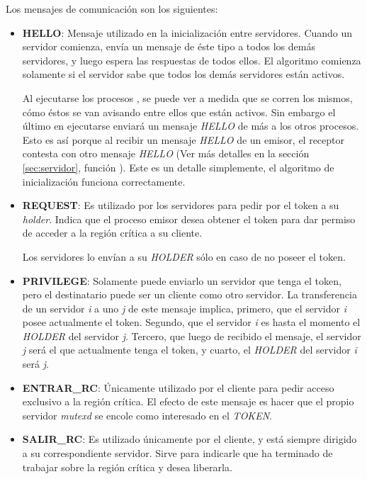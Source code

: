 Los mensajes de comunicación son los siguientes:

\begin{itemize}

\item \textbf{HELLO}: Mensaje utilizado en la inicialización entre servidores.
Cuando un servidor comienza, envía un mensaje de éste tipo a todos los demás
servidores, y luego espera las respuestas de todos ellos. El algoritmo comienza
solamente si el servidor sabe que todos los demás servidores están activos.

Al ejecutarse los procesos , se puede ver a medida que se
corren los mismos, cómo éstos se van avisando entre ellos que están activos.
Sin embargo el último en ejecutarse enviará un mensaje \emph{HELLO} de más a
los otros procesos. Esto es así porque al recibir un mensaje \emph{HELLO} de un
emisor, el receptor contesta con otro mensaje \emph{HELLO} (Ver más detalles en
la sección \ref{sec:servidor}, función ). Este es un
detalle simplemente, el algoritmo de inicialización funciona correctamente.

\item \textbf{REQUEST}: Es utilizado por los servidores para pedir por el token
a su \emph{holder}. Indica que el proceso  emisor desea obtener
el token para dar permiso de acceder a la región crítica a su cliente.

Los servidores lo envían a su \emph{HOLDER} sólo en caso de no poseer el token.

\item \textbf{PRIVILEGE}: Solamente puede enviarlo un servidor que tenga el
token, pero el destinatario puede ser un cliente como otro servidor. La
transferencia de un servidor \textsl{i} a uno \textsl{j} de este mensaje
implica, primero, que el servidor \textsl{i} posee actualmente el token.
Segundo, que el servidor \textsl{i} es hasta el momento el \emph{HOLDER} del
servidor \textsl{j}. Tercero, que luego de recibido el mensaje, el servidor
\textsl{j} será el que actualmente tenga el token, y cuarto, el \emph{HOLDER}
del servidor \textsl{i} será \textsl{j}.

\item \textbf{ENTRAR\_RC}: Únicamente utilizado por el cliente para pedir
acceso exclusivo a la región crítica. El efecto de este mensaje es hacer que el 
propio servidor \emph{mutexd} se encole como interesado en el \emph{TOKEN}.

\item \textbf{SALIR\_RC}: Es utilizado únicamente por el cliente, y está
siempre dirigido a su correspondiente servidor. Sirve para indicarle que ha
terminado de trabajar sobre la región crítica y desea liberarla.

\end{itemize}

